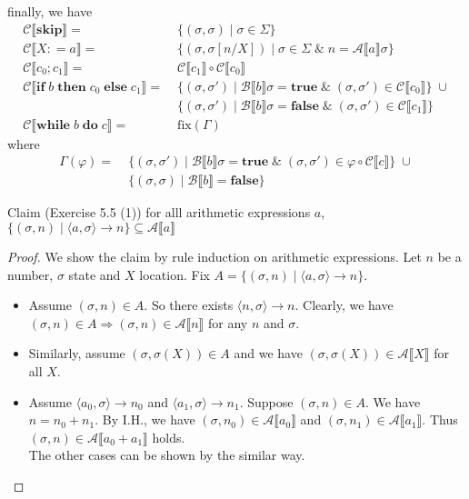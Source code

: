 \documentclass[12pt,aspectratio=169]{beamer}
\newcommand{\Com}{\mathbf{Com}}
\newcommand{\denoA}[1]{\mathcal{A} \llbracket #1 \rrbracket}
\newcommand{\denoB}[1]{\mathcal{B} \llbracket #1 \rrbracket}
\newcommand{\denoC}[1]{\mathcal{C} \llbracket #1 \rrbracket}
\newcommand{\true}{\mathbf{true}}
\newcommand{\false}{\mathbf{false}}
\newcommand{\Skip}{\mathbf{skip}}
\def\coloneqq{\mathrel{\mathop:}=}
\newcommand{\Assign}[2]{#1 \coloneqq #2}
\newcommand{\ITE}[3]{\mathbf{if}\; #1 \; \mathbf{then} \; #2 \; \mathbf{else} \; #3}
\newcommand{\While}[2]{\mathbf{while}\; #1 \; \mathbf{do} \; #2}
\newcommand{\deriv}[3]{\langle #1, #2 \rangle \rightarrow #3}
\begin{document}
\begin{frame}
    finally, we have
    \begin{align*}
        \denoC{\Skip} =& \;\{(\sigma,\sigma) \mid \sigma \in \Sigma\}\\
        \denoC{\Assign{X}{a}} =& \;\{(\sigma,\sigma[n/X]) \mid \sigma \in \Sigma \; \& \; n = \denoA{a}\sigma\}\\
        \denoC{c_0;c_1} =& \;\denoC{c_1} \circ \denoC{c_0}\\
        \denoC{\ITE{b}{c_0}{c_1}} =& \;
            \{(\sigma,\sigma') \mid \denoB{b}\sigma = \true \; \& \; (\sigma, \sigma') \in \denoC{c_0}\} \; \cup\\
            & \;\{(\sigma,\sigma') \mid \denoB{b}\sigma = \false \; \& \; (\sigma, \sigma') \in \denoC{c_1}\}\\
        \denoC{\While{b}{c}} = & \; \mathrm{fix}(\Gamma)
    \end{align*}
    where
    \begin{align*}
        \Gamma(\varphi) = & \; \{ (\sigma, \sigma') \mid \denoB{b}\sigma = \true \; \& \; (\sigma, \sigma') \in \varphi \circ \denoC{c}\} \; \cup \\
        & \; \{(\sigma,\sigma) \mid \denoB{b} = \false \}
    \end{align*}
\end{frame}

\begin{frame}
    \begin{block}{Claim (Exercise 5.5 (1))}
        for alll arithmetic expressions $a$, $\{(\sigma, n) \mid \langle a, \sigma \rangle \rightarrow n\} \subseteq \denoA{a}$
    \end{block}
    \begin{proof}
        We show the claim by rule induction on arithmetic expressions.
        Let $n$ be a number, $\sigma$ state and $X$ location.
        Fix $A = \{(\sigma, n) \mid \deriv{a}{\sigma}{n}\}$.
        \begin{itemize}
            \item Assume $(\sigma, n) \in A$. So there exists $\deriv{n}{\sigma}{n}$.
                Clearly, we have $(\sigma,n) \in A \Rightarrow (\sigma,n) \in \denoA{n}$ for any $n$ and $\sigma$.
            \item Similarly, assume $(\sigma, \sigma(X)) \in A$ and we have $(\sigma, \sigma(X)) \in \denoA{X}$ for all $X$.
            \item Assume $\deriv{a_0}{\sigma}{n_0}$ and $\deriv{a_1}{\sigma}{n_1}$.
                Suppose $(\sigma, n) \in A$. We have $n = n_0 + n_1$.
                By I.H., we have $(\sigma, n_0) \in \denoA{a_0}$ and $(\sigma,n_1) \in \denoA{a_1}$.
                Thus $(\sigma, n) \in \denoA{a_0 + a_1} $ holds.\\
                The other cases can be shown by the similar way.
        \end{itemize}
    \end{proof}
\end{frame}
\end{document}
